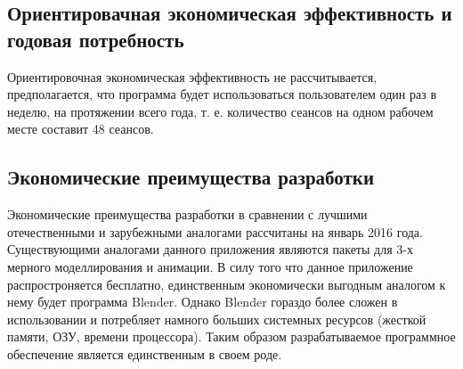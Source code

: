 \subsection{Ориентировачная экономическая эффективность и годовая потребность}
Ориентировочная экономическая эффективность не рассчитывается, предполагается, что программа будет использоваться пользователем один раз в неделю, на протяжении всего года, т. е. количество сеансов на одном рабочем месте составит 48 сеансов.

\subsection{Экономические преимущества разработки}
Экономические преимущества разработки в сравнении с лучшими отечественными и зарубежными аналогами рассчитаны на январь 2016 года. Существующими аналогами данного приложения являются пакеты для 3-х мерного моделлирования и анимации. В силу того что данное приложение распростроняется бесплатно, единственным экономически выгодным аналогом к нему будет программа Blender. Однако Blender гораздо более сложен в использовании и потребляет намного больших системных ресурсов (жесткой памяти, ОЗУ, времени процессора). Таким образом разрабатываемое программное обеспечение  является единственным в своем роде.
